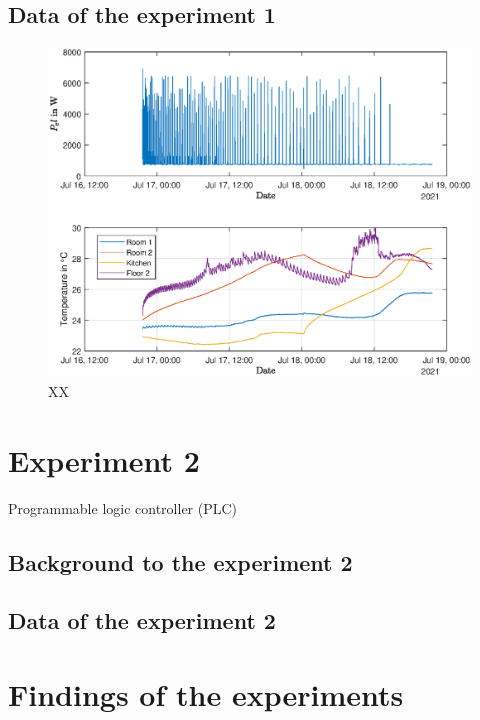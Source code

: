 \subsection{Data of the experiment 1}
\label{subsec:Data of the experiment 1}
\begin{figure}
            \centering
            \includegraphics[]{figure/P_el_trainingsdaten_latex.eps}
           \caption{XX}
           \label{fig:P_elTemperatureExperiment1}
    \end{figure}
\section{Experiment 2}
\label{sec:Experiment2}
Programmable logic controller (PLC)

\subsection{Background to the experiment 2}
\label{subsec:Backgroud to experiment 2}

\subsection{Data of the experiment 2}
\label{subsec:Data of the experiment 2}

\section{Findings of the experiments}
\label{sec:findings of the experiments}
